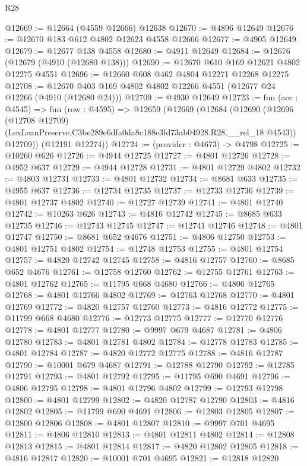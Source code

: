 \begin{lexlean}{R28}
\begin{coremodule}
@12669 := @12664 (@4559 @12666) @12638
@12670 := @4896 @12649
@12676 := @12670 @183 @612 @4802 @12623 @4558 @12666
@12677 := @4905 @12649
@12679 := @12677 @138 @4558
@12680 := @4911 @12649
@12684 := @12676 (@12679 (@4910 (@12680 @138)))
@12690 := @12670 @610 @169 @12621 @4802 @12275 @4551
@12696 := @12660 @608 @462 @4804 @12271 @12268 @12275
@12708 := @12670 @403 @169 @4802 @4802 @12266 @4551 (@12677 @24 @12266 (@4910 (@12680 @24)))
@12709 := @4930 @12649
@12723 := fun (acc : @4545) =>
  fun (row : @4595) =>
  @12659
    (@12669
      (@12684
        (@12690
          (@12696
            (@12708 @12709)
            (LexLeanPreserve.C3be289e6dfa0da8c188e3fd73ab04928.R28.__rel_18 @4543))
          @12709))
      (@12191 @12274))
@12724 := (provider : @4673) -> @4798
@12725 := @10260 @626
@12726 := @4944 @12725
@12727 := @4801 @12726
@12728 := @4952 @637
@12729 := @4944 @12728
@12731 := @4801 @12729 @4802
@12732 := @4803 @12731
@12733 := @4801 @12732
@12734 := @8681 @633
@12735 := @4955 @637
@12736 := @12734 @12735
@12737 := @12733 @12736
@12739 := @4801 @12737 @4802
@12740 := @12727 @12739
@12741 := @4801 @12740
@12742 := @10263 @626
@12743 := @4816 @12742
@12745 := @8685 @633 @12735
@12746 := @12743 @12745
@12747 := @12741 @12746
@12748 := @4801 @12747
@12750 := @8681 @652 @4676
@12751 := @4806 @12750
@12753 := @4801 @12751 @4802
@12754 := @12748 @12753
@12755 := @4801 @12754
@12757 := @4820 @12742 @12745
@12758 := @4816 @12757
@12760 := @8685 @652 @4676
@12761 := @12758 @12760
@12762 := @12755 @12761
@12763 := @4801 @12762
@12765 := @11795 @668 @4680
@12766 := @4806 @12765
@12768 := @4801 @12766 @4802
@12769 := @12763 @12768
@12770 := @4801 @12769
@12772 := @4820 @12757 @12760
@12773 := @4816 @12772
@12775 := @11799 @668 @4680
@12776 := @12773 @12775
@12777 := @12770 @12776
@12778 := @4801 @12777
@12780 := @9997 @679 @4687
@12781 := @4806 @12780
@12783 := @4801 @12781 @4802
@12784 := @12778 @12783
@12785 := @4801 @12784
@12787 := @4820 @12772 @12775
@12788 := @4816 @12787
@12790 := @10001 @679 @4687
@12791 := @12788 @12790
@12792 := @12785 @12791
@12793 := @4801 @12792
@12795 := @11795 @690 @4691
@12796 := @4806 @12795
@12798 := @4801 @12796 @4802
@12799 := @12793 @12798
@12800 := @4801 @12799
@12802 := @4820 @12787 @12790
@12803 := @4816 @12802
@12805 := @11799 @690 @4691
@12806 := @12803 @12805
@12807 := @12800 @12806
@12808 := @4801 @12807
@12810 := @9997 @701 @4695
@12811 := @4806 @12810
@12813 := @4801 @12811 @4802
@12814 := @12808 @12813
@12815 := @4801 @12814
@12817 := @4820 @12802 @12805
@12818 := @4816 @12817
@12820 := @10001 @701 @4695
@12821 := @12818 @12820

\end{coremodule}
\end{lexlean}
